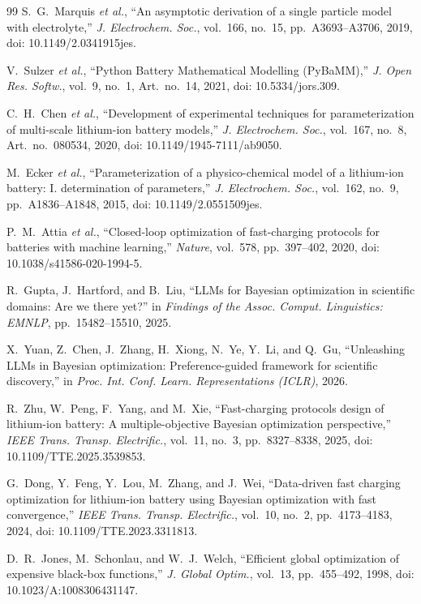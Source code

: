 \documentclass[journal]{IEEEtran}
\begin{document}
\begin{thebibliography}{99}
S.~G.~Marquis \textit{et al.}, ``An asymptotic derivation of a single particle
model with electrolyte,'' \textit{J. Electrochem. Soc.}, vol.~166, no.~15,
pp.~A3693--A3706, 2019, doi: 10.1149/2.0341915jes.

V.~Sulzer \textit{et al.}, ``Python Battery Mathematical Modelling (PyBaMM),''
\textit{J. Open Res. Softw.}, vol.~9, no.~1, Art.~no.~14, 2021,
doi: 10.5334/jors.309.

C.~H.~Chen \textit{et al.}, ``Development of experimental techniques for
parameterization of multi-scale lithium-ion battery models,''
\textit{J. Electrochem. Soc.}, vol.~167, no.~8, Art.~no.~080534, 2020,
doi: 10.1149/1945-7111/ab9050.

M.~Ecker \textit{et al.}, ``Parameterization of a physico-chemical model of a
lithium-ion battery: I. determination of parameters,''
\textit{J. Electrochem. Soc.}, vol.~162, no.~9, pp.~A1836--A1848, 2015,
doi: 10.1149/2.0551509jes.

P.~M.~Attia \textit{et al.}, ``Closed-loop optimization of fast-charging
protocols for batteries with machine learning,'' \textit{Nature}, vol.~578,
pp.~397--402, 2020, doi: 10.1038/s41586-020-1994-5.

R.~Gupta, J.~Hartford, and B.~Liu, ``LLMs for Bayesian optimization in
scientific domains: Are we there yet?'' in \textit{Findings of the Assoc.
Comput. Linguistics: EMNLP}, pp.~15482--15510, 2025.

X.~Yuan, Z.~Chen, J.~Zhang, H.~Xiong, N.~Ye, Y.~Li, and Q.~Gu,
``Unleashing LLMs in Bayesian optimization: Preference-guided framework for
scientific discovery,'' in \textit{Proc. Int. Conf. Learn. Representations
(ICLR)}, 2026.

R.~Zhu, W.~Peng, F.~Yang, and M.~Xie, ``Fast-charging protocols design of
lithium-ion battery: A multiple-objective Bayesian optimization perspective,''
\textit{IEEE Trans. Transp. Electrific.}, vol.~11, no.~3,
pp.~8327--8338, 2025, doi: 10.1109/TTE.2025.3539853.

G.~Dong, Y.~Feng, Y.~Lou, M.~Zhang, and J.~Wei, ``Data-driven fast charging
optimization for lithium-ion battery using Bayesian optimization with fast
convergence,'' \textit{IEEE Trans. Transp. Electrific.}, vol.~10, no.~2,
pp.~4173--4183, 2024, doi: 10.1109/TTE.2023.3311813.

D.~R.~Jones, M.~Schonlau, and W.~J.~Welch, ``Efficient global optimization of
expensive black-box functions,'' \textit{J. Global Optim.}, vol.~13,
pp.~455--492, 1998, doi: 10.1023/A:1008306431147.


\end{thebibliography}
\end{document}
